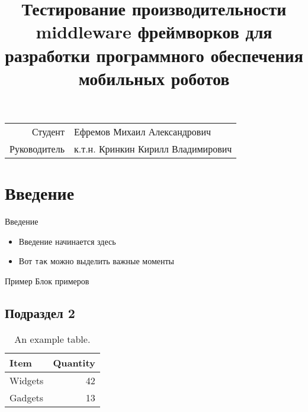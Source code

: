 \documentclass{beamer}
\title[MARM Performance Testing]{Тестирование производительности middleware фреймворков для разработки программного обеспечения мобильных роботов}
\date{}
\begin{document}
	
	\begin{frame}
	  \titlepage
	  	  \vspace{-6em}
	   	  \centering
	  	  \begin{tabular}{r|l}
	  	  	Студент & Ефремов Михаил Александрович \\
	  	  	Руководитель & к.т.н. Кринкин Кирилл Владимирович
	  	  \end{tabular}
	\end{frame}
	
	\section{Введение}
	\begin{frame}{Введение}
		\begin{itemize}
		  \item Введение начинается здесь
		  \item Вот \texttt{так} можно выделить важные моменты
		\end{itemize}
		
		\vskip 1cm
		
		\begin{block}{Пример}
			Блок примеров
		\end{block}
	\end{frame}
	
	\subsection{Подраздел 2}
	\begin{frame}
		\begin{table}
			\centering
			\begin{tabular}{l|r}
				Item & Quantity \\\hline
				Widgets & 42 \\
				Gadgets & 13
			\end{tabular}
			\caption{\label{tab:widgets}An example table.}
		\end{table}
	
	\end{frame}
\end{document}
